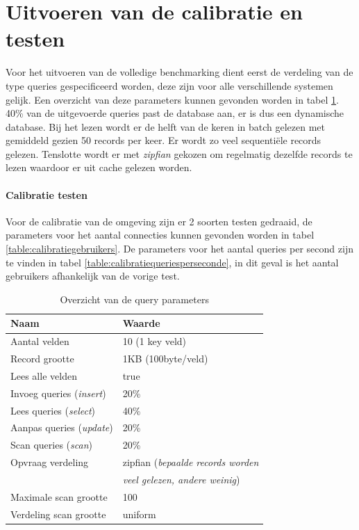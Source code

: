 \section{Uitvoeren van de calibratie en testen}
Voor het uitvoeren van de volledige benchmarking dient eerst de verdeling van de type queries gespecificeerd worden, deze zijn voor alle verschillende systemen gelijk. Een overzicht van deze parameters kunnen gevonden worden in tabel \ref{table:calibratiequeries}. 40\% van de uitgevoerde queries past de database aan, er is dus een dynamische database. Bij het lezen wordt er de helft van de keren in batch gelezen met gemiddeld gezien 50 records per keer. Er wordt zo veel sequentiële records gelezen. Tenslotte wordt er met \textit{zipfian} gekozen om regelmatig dezelfde records te lezen waardoor er uit cache gelezen worden. 

\paragraph{Calibratie testen} Voor de calibratie van de omgeving zijn er 2 soorten testen gedraaid, de parameters voor het aantal connecties kunnen gevonden worden in tabel \ref{table:calibratiegebruikers}. De parameters voor het aantal queries per second zijn te vinden in tabel \ref{table:calibratiequeriesperseconde}, in dit geval is het aantal gebruikers afhankelijk van de vorige test. 

\begin{table}[h!]
	\centering
	\begin{tabular}{l| l }
	\textbf{Naam} & \textbf{Waarde} \\
	\hline
	Aantal velden & 10 (1 key veld) \\
	Record grootte & 1KB (100byte/veld) \\
	Lees alle velden & true \\
	Invoeg queries (\textit{insert}) & 20\%\\
	Lees queries (\textit{select}) & 40\%\\
	Aanpas queries (\textit{update}) & 20\%\\
	Scan queries (\textit{scan}) & 20\%\\
	Opvraag verdeling & zipfian (\textit{bepaalde records worden} \\
	& \textit{veel gelezen, andere weinig}) \\
	Maximale scan grootte & 100 \\
	Verdeling scan grootte & uniform \\
	\end{tabular}
	\caption{Overzicht van de query parameters}
	\label{table:calibratiequeries}
\end{table}


